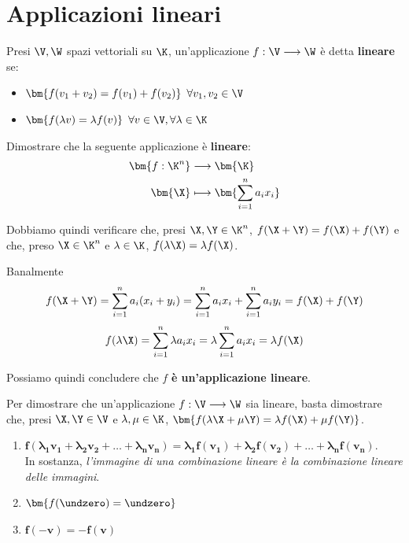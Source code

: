 \documentclass[11pt, a4paper, titlepage, oneside]{scrbook}
\begin{document}
\section{Applicazioni lineari}

\begin{Definizione}
\label{def-app-lin}
Presi $\V, \W$ spazi vettoriali su $\K$, un'applicazione $f: \V \longrightarrow \W$ è detta \textbf{lineare} se:
\begin{itemize}
    \item $\bm{f(v_1 + v_2) = f(v_1) + f(v_2)} \enspace \forall v_1, v_2 \in \V$
    \item $\bm{f(\lambda v) = \lambda f(v)} \enspace \forall v \in \V, \forall \lambda \in \K$
\end{itemize}
\end{Definizione}


\Esempio \nopagebreak

Dimostrare che la seguente applicazione è \textbf{lineare}: \nopagebreak
\begin{align*}
\bm{f: \K^n} &\longrightarrow \bm{\K} \\
\bm{\X} &\longmapsto \bm{\sum_{i = 1}^n a_i x_i}
\end{align*}

Dobbiamo quindi verificare che, presi $\X, \Y \in \K^n$, $f(\X + \Y) = f(\X) + f(\Y)$ e che, preso $\X \in \K^n$ e $\lambda \in \K$, $f(\lambda \X) = \lambda f(\X)$.

Banalmente 
\[f(\X + \Y) = \sum_{i = 1}^n a_i(x_i + y_i) = \sum_{i = 1}^n a_i x_i + \sum_{i = 1}^n a_i y_i = f(\X) + f(\Y)\]
\[f(\lambda \X) = \sum_{i = 1}^n \lambda a_i x_i = \lambda \sum_{i = 1}^n a_i x_i = \lambda f(\X)\]

Possiamo quindi concludere che $f$ \textbf{è un'applicazione lineare}.

\begin{Osservazione}[]
\label{oss-app-lin}
Per dimostrare che un'applicazione $f: \V \longrightarrow \W$ sia lineare, basta dimostrare che, presi $\X, \Y \in \V$ e $\lambda, \mu \in \K$, $\bm{f(\lambda \X + \mu \Y) = \lambda f(\X) + \mu f(\Y)}$.
\end{Osservazione}

\begin{Proprieta}
\label{prop-app-lin}
\begin{enumerate}
    \item $\bm{f(\lambda_1 v_1 + \lambda_2 v_2 + \ldots + \lambda_n v_n) = \lambda_1 f(v_1) + \lambda_2 f(v_2) + \ldots  + \lambda_n f(v_n)}$. \\ 
    In sostanza, \textit{l'immagine di una combinazione lineare è la combinazione lineare delle immagini}.
    \item $\bm{f(\undzero) = \undzero}$
    \item $\bm{f(-v) = -f(v)}$
\end{enumerate}
\end{Proprieta}
\end{document}
